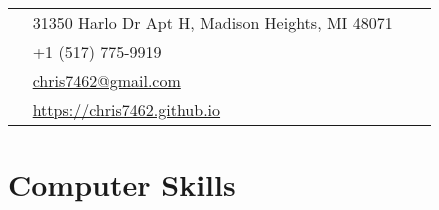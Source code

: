 \documentclass[10pt]{article} %
\begin{document}
\begin{paracol}{2}
  \parbox[top][0.08\textheight][c]{\linewidth}{ %
    \vspace{-0.02\textheight} %
    \colorbox{shade}{ %
      \begin{supertabular}{p{0.01\linewidth}|p{0.83\linewidth}} %
        \raisebox{-1pt}{\hspace{-2ex}\faHome} & 31350 Harlo Dr Apt H, Madison Heights, MI 48071\\ %
        \raisebox{-1pt}{\hspace{-2ex}\faPhone} & +1 (517) 775-9919 \\ %
        \raisebox{0pt}{\hspace{-2ex}\small\faEnvelope} & \href{mailto:chris7462@gmail.com}{chris7462@gmail.com} \\ %
        \raisebox{-1pt}{\hspace{-2ex}\small\faDesktop} & \href{https://chris7462.github.io}{https://chris7462.github.io} \\ %
      \end{supertabular}
    }
  }


  \section{Computer Skills} 




\end{paracol}
\end{document}
